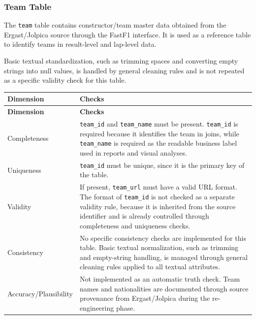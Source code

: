 \documentclass[a4paper,11pt]{article}
\begin{document}
	
	\subsubsection{Team Table}
	
	The \texttt{team} table contains constructor/team master data obtained from the
	Ergast/Jolpica source through the FastF1 interface. It is used as a reference table
	to identify teams in result-level and lap-level data.
	
	Basic textual standardization, such as trimming spaces and converting
	empty strings into null values, is handled by general cleaning rules and is not repeated
	as a specific validity check for this table.
	
	\begin{longtable}{p{3.5cm}p{11cm}}
		\toprule
		\textbf{Dimension} & \textbf{Checks} \\
		\midrule
		\endfirsthead
		
		\toprule
		\textbf{Dimension} & \textbf{Checks} \\
		\midrule
		\endhead
		
		Completeness
		& \texttt{team\_id} and \texttt{team\_name} must be present.
		\texttt{team\_id} is required because it identifies the team in joins, while
		\texttt{team\_name} is required as the readable business label used in reports
		and visual analyses. \\
		\midrule
		
		Uniqueness
		& \texttt{team\_id} must be unique, since it is the primary key of the table. \\
		\midrule
		
		Validity
		& If present, \texttt{team\_url} must have a valid URL format.
		The format of \texttt{team\_id} is not checked as a separate validity rule,
		because it is inherited from the source identifier and is already controlled
		through completeness and uniqueness checks. \\
		\midrule
		
		Consistency
		& No specific consistency checks are implemented for this table.
		Basic textual normalization, such as trimming and empty-string handling, is
		managed through general cleaning rules applied to all textual attributes. \\
		\midrule
		
		Accuracy/Plausibility
		& Not implemented as an automatic truth check. Team names and nationalities are
		documented through source provenance from Ergast/Jolpica during the
		re-engineering phase. \\
		\midrule
		
		\bottomrule
	\end{longtable}
\end{document}
